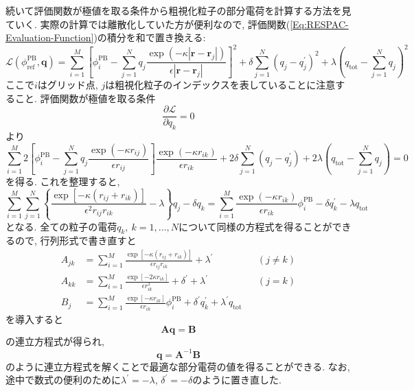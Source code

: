 続いて評価関数が極値を取る条件から粗視化粒子の部分電荷を計算する方法を見ていく.
実際の計算では離散化していた方が便利なので, 評価関数(\ref{Eq:RESPAC-Evaluation-Function})の積分を和で置き換える:
\begin{equation}
    \mathcal{L} (\phi_{\mathrm{ref}}^{\mathrm{PB}}, \bm{q})
    =
    \sum_{i=1}^{M}
    \left[
        \phi_{i}^{\mathrm{PB}}
        -
        \sum_{j=1}^{N}
        q_{j}
        \frac{\exp(-\kappa |\bm{r} - \bm{r}_{j}|)}{\epsilon |\bm{r} - \bm{r}_{j}|}
    \right]^{2}
    +
    \delta \sum_{j=1}^{N} (q_{j} - q_{j}^{\prime})^{2}
    +
    \lambda(q_{\mathrm{tot}} - \sum_{j=1}^{N} q_{j})^{2}
    \label{Eq:RESPAC-Evaluation-Function-Discrete}
\end{equation}
ここで$i$はグリッド点, $j$は粗視化粒子のインデックスを表していることに注意すること.
評価関数が極値を取る条件
\begin{equation}
    \frac{\partial \mathcal{L}}{\partial q_{k}} = 0
\end{equation}
より
\begin{equation}
    \sum_{i=1}^{M}
    2
    \left[
        \phi_{i}^{\mathrm{PB}}
        -
        \sum_{j=1}^{N}
        q_{j}
        \frac{\exp(-\kappa r_{ij})}{\epsilon r_{ij}}
    \right]
    \frac{\exp(-\kappa r_{ik})}{\epsilon r_{ik}}
    +
    2 \delta \sum_{j=1}^{N} (q_{j} - q_{j}^{\prime})
    +
    2 \lambda(q_{\mathrm{tot}} - \sum_{j=1}^{N} q_{j})
    =
    0
\end{equation}
を得る. これを整理すると,
\begin{equation}
    \sum_{i=1}^{M} \sum_{j=1}^{N}
    \left\{
        \frac{\exp[-\kappa (r_{ij} + r_{ik})]}{\epsilon^{2} r_{ij}r_{ik}}
        -
        \lambda
    \right\} q_{j}
    -
    \delta q_{k}
    =
    \sum_{i=1}^{M}
    \frac{\exp(-\kappa r_{ik})}{\epsilon r_{ik}} \phi_{i}^{\mathrm{PB}}
    -
    \delta q_{k}^{\prime}
    -
    \lambda q_{\mathrm{tot}}
\end{equation}
となる. 全ての粒子の電荷$q_{k},~k = 1,\ldots,N$について同様の方程式を得ることができるので, 行列形式で書き直すと
\begin{align}
    A_{jk}
    &=
    \sum_{i=1}^{M}
    \frac{\exp[-\kappa(r_{ij} + r_{ik})]}{\epsilon r_{ij}r_{ik}}
    + \lambda^{\prime}
    &&(j\neq k)
    \\
    A_{kk}
    &=
    \sum_{i=1}^{M}
    \frac{\exp[-2\kappa r_{ik}]}{\epsilon r_{ik}^{2}}
    + \delta^{\prime}
    + \lambda^{\prime}
    &&(j = k)
    \\
    B_{j}
    &=
    \sum_{i=1}^{M}
    \frac{\exp[-\kappa r_{ik}]}{\epsilon r_{ik}} \phi_{i}^{\mathrm{PB}}
    +
    \delta^{\prime} q_{k}^{\prime}
    +
    \lambda^{\prime} q_{\mathrm{tot}}
\end{align}
を導入すると
\begin{equation}
    \bm{A} \bm{q} = \bm{B}
\end{equation}
の連立方程式が得られ,
\begin{equation}
    \bm{q} = \bm{A}^{-1}\bm{B}
\end{equation}
のように連立方程式を解くことで最適な部分電荷の値を得ることができる.
なお, 途中で数式の便利のために$\lambda^{\prime} = -\lambda$, $\delta^{\prime} = -\delta$のように置き直した.

